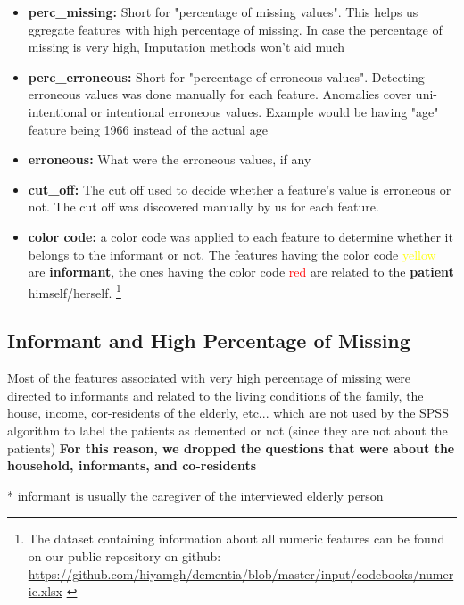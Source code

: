 \documentclass{article}
\begin{document}
\begin{itemize}
\item \textbf{perc\_missing:} Short for "percentage of missing values". This helps us ggregate features with high percentage of missing. In case the percentage of missing is very high, Imputation methods won't aid much

\item \textbf{perc\_erroneous:} Short for "percentage of erroneous values". Detecting erroneous values was done manually for each feature. Anomalies cover uni-intentional or intentional erroneous values. Example would be having "age" feature being 1966 instead of the actual age

\item \textbf{erroneous:} What were the erroneous values, if any

\item \textbf{cut\_off:} The cut off used to decide whether a feature's value is erroneous or not. The cut off was discovered manually by us for each feature.

\item \textbf{color code:} a color code was applied to each feature to determine whether it belongs to the informant or not. The features having the color code \textcolor{yellow}{yellow} are \textbf{informant}, the ones having the color code \textcolor{red}{red} are related to the \textbf{patient} himself/herself. \footnote{The dataset containing information about all numeric features can be found on our public repository on github: \url{https://github.com/hiyamgh/dementia/blob/master/input/codebooks/numeric.xlsx} \label{numeric_codebook}}
\end{itemize} 


\subsection{Informant and High Percentage of Missing}
Most of the features associated with very high percentage of missing were directed to informants and related to the living conditions of the family, the house, income, cor-residents of the elderly, etc... which are not used by the SPSS algorithm to label the patients as demented or not (since they are not about the patients) \textbf{For this reason, we dropped the questions that were about the household, informants, and co-residents}

* informant is usually the caregiver of the interviewed elderly person
\end{document}
